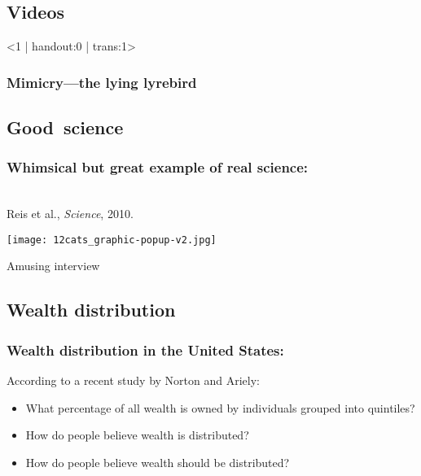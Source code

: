 
\subsection{Videos}

\begin{frame}<1 | handout:0 | trans:1>
  \frametitle{Mimicry---the lying lyrebird}





\end{frame}


\subsection{Good\ science}

\begin{frame}
  \frametitle{Whimsical but great example of real science:}

  \\
  Reis et al., \textit{Science}, 2010.

  \medskip

  \texttt{[image: 12cats\_graphic-popup-v2.jpg]}

  Amusing interview 

\end{frame}


\subsection{Wealth distribution}

\begin{frame}
  \frametitle{Wealth distribution in the United States:}

  According to a recent study by Norton and Ariely:~\cite{norton2011a}
  \begin{itemize}
  \item<2->
    What percentage of all wealth is owned by 
    individuals grouped into quintiles?
  \item<3->
    How do people believe wealth is distributed?
  \item<4->
    How do people believe wealth should be distributed?
  \end{itemize}
  
\end{frame}

